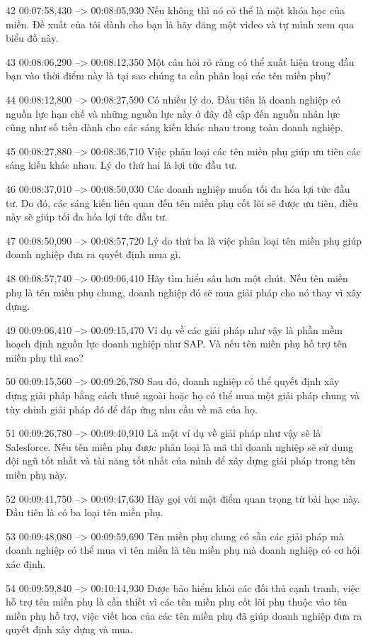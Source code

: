 42
00:07:58,430 --> 00:08:05,930
Nếu không thì nó có thể là một khóa học của miền.  Đề xuất của tôi dành cho bạn là hãy đăng một video và tự mình xem qua biểu đồ này.

43
00:08:06,290 --> 00:08:12,350
Một câu hỏi rõ ràng có thể xuất hiện trong đầu bạn vào thời điểm này là tại sao chúng ta cần phân loại các tên miền phụ?

44
00:08:12,800 --> 00:08:27,590
Có nhiều lý do.  Đầu tiên là doanh nghiệp có nguồn lực hạn chế và những nguồn lực này ở đây đề cập đến nguồn nhân lực cũng như số tiền dành cho các sáng kiến ​​​​khác nhau trong toàn doanh nghiệp.

45
00:08:27,880 --> 00:08:36,710
Việc phân loại các tên miền phụ giúp ưu tiên các sáng kiến ​​​​khác nhau.  Lý do thứ hai là lợi tức đầu tư.

46
00:08:37,010 --> 00:08:50,030
Các doanh nghiệp muốn tối đa hóa lợi tức đầu tư.  Do đó, các sáng kiến ​​liên quan đến tên miền phụ cốt lõi sẽ được ưu tiên, điều này sẽ giúp tối đa hóa lợi tức đầu tư.

47
00:08:50,090 --> 00:08:57,720
Lý do thứ ba là việc phân loại tên miền phụ giúp doanh nghiệp đưa ra quyết định mua gì.

48
00:08:57,740 --> 00:09:06,410
Hãy tìm hiểu sâu hơn một chút.  Nếu tên miền phụ là tên miền phụ chung, doanh nghiệp đó sẽ mua giải pháp cho nó thay vì xây dựng.

49
00:09:06,410 --> 00:09:15,470
Ví dụ về các giải pháp như vậy là phần mềm hoạch định nguồn lực doanh nghiệp như SAP.  Và nếu tên miền phụ hỗ trợ tên miền phụ thì sao?

50
00:09:15,560 --> 00:09:26,780
Sau đó, doanh nghiệp có thể quyết định xây dựng giải pháp bằng cách thuê ngoài hoặc họ có thể mua một giải pháp chung và tùy chỉnh giải pháp đó để đáp ứng nhu cầu về mã của họ.

51
00:09:26,780 --> 00:09:40,910
Là một ví dụ về giải pháp như vậy sẽ là Salesforce.  Nếu tên miền phụ được phân loại là mã thì doanh nghiệp sẽ sử dụng đội ngũ tốt nhất và tài năng tốt nhất của mình để xây dựng giải pháp trong tên miền phụ này.

52
00:09:41,750 --> 00:09:47,630
Hãy gọi với một điểm quan trọng từ bài học này.  Đầu tiên là có ba loại tên miền phụ.

53
00:09:48,080 --> 00:09:59,690
Tên miền phụ chung có sẵn các giải pháp mà doanh nghiệp có thể mua vì tên miền là tên miền phụ mà doanh nghiệp có cơ hội xác định.

54
00:09:59,840 --> 00:10:14,930
Được bảo hiểm khỏi các đối thủ cạnh tranh, việc hỗ trợ tên miền phụ là cần thiết vì các tên miền phụ cốt lõi phụ thuộc vào tên miền phụ hỗ trợ, việc viết hoa của các tên miền phụ đã giúp doanh nghiệp đưa ra quyết định xây dựng và mua.

